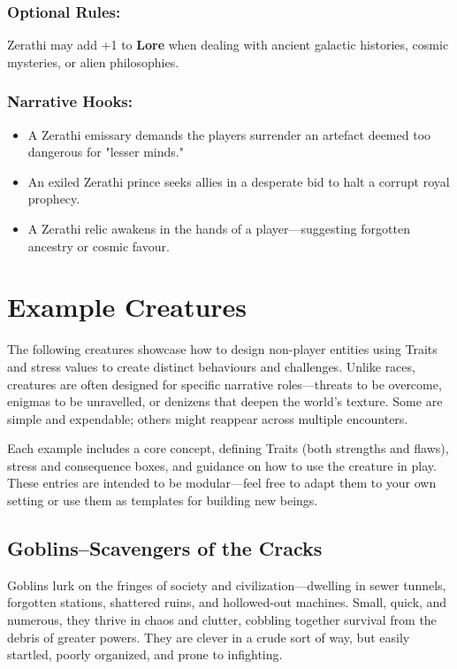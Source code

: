 \subsubsection{Optional Rules:} Zerathi may add +1 to \textbf{Lore} when dealing with ancient galactic histories, cosmic mysteries, or alien philosophies.

\subsubsection{Narrative Hooks:}
\begin{itemize}\raggedright
  \item A Zerathi emissary demands the players surrender an artefact deemed too dangerous for "lesser minds."
  \item An exiled Zerathi prince seeks allies in a desperate bid to halt a corrupt royal prophecy.
  \item A Zerathi relic awakens in the hands of a player—suggesting forgotten ancestry or cosmic favour.
\end{itemize}




\section{Example Creatures}

The following creatures showcase how to design non-player entities using Traits and stress values to create distinct behaviours and challenges. Unlike races, creatures are often designed for specific narrative roles—threats to be overcome, enigmas to be unravelled, or denizens that deepen the world’s texture. Some are simple and expendable; others might reappear across multiple encounters.

Each example includes a core concept, defining Traits (both strengths and flaws), stress and consequence boxes, and guidance on how to use the creature in play. These entries are intended to be modular—feel free to adapt them to your own setting or use them as templates for building new beings.

\subsection*{Goblins–Scavengers of the Cracks}

Goblins lurk on the fringes of society and civilization—dwelling in sewer tunnels, forgotten stations, shattered ruins, and hollowed-out machines. Small, quick, and numerous, they thrive in chaos and clutter, cobbling together survival from the debris of greater powers. They are clever in a crude sort of way, but easily startled, poorly organized, and prone to infighting.

